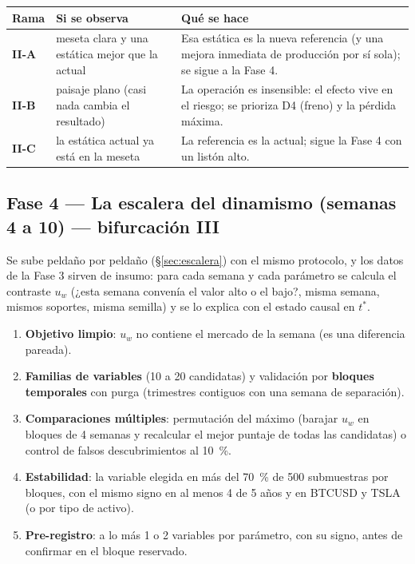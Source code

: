 \documentclass[11pt,a4paper]{article}
\begin{document}
\begin{table}[H]
\centering\small
\begin{tabularx}{\linewidth}{lXX}
\toprule
Rama & Si se observa & Qué se hace \\
\midrule
\textbf{II-A} & meseta clara y una estática mejor que la actual & Esa estática es la nueva referencia (y una mejora inmediata de producción por sí sola); se sigue a la Fase 4. \\
\textbf{II-B} & paisaje plano (casi nada cambia el resultado) & La operación es insensible: el efecto vive en el riesgo; se prioriza D4 (freno) y la pérdida máxima. \\
\textbf{II-C} & la estática actual ya está en la meseta & La referencia es la actual; sigue la Fase 4 con un listón alto. \\
\bottomrule
\end{tabularx}
\end{table}

\subsection{Fase 4 — La escalera del dinamismo (semanas 4 a 10) — bifurcación III}
Se sube peldaño por peldaño (§\ref{sec:escalera}) con el mismo protocolo, y los datos de la Fase 3 sirven de insumo:
para cada semana y cada parámetro se calcula el contraste $u_w$ (¿esta semana convenía el valor alto o el bajo?, misma
semana, mismos soportes, misma semilla) y se lo explica con el estado causal en $t^*$.

\begin{enumerate}[leftmargin=1.6em]
  \item \textbf{Objetivo limpio}: $u_w$ no contiene el mercado de la semana (es una diferencia pareada).
  \item \textbf{Familias de variables} (10 a 20 candidatas) y validación por \textbf{bloques temporales} con purga (trimestres
        contiguos con una semana de separación).
  \item \textbf{Comparaciones múltiples}: permutación del máximo (barajar $u_w$ en bloques de 4 semanas y recalcular el mejor puntaje
        de todas las candidatas) o control de falsos descubrimientos al 10~\%.
  \item \textbf{Estabilidad}: la variable elegida en más del 70~\% de 500 submuestras por bloques, con el mismo signo en al menos
        4 de 5 años y en BTCUSD y TSLA (o por tipo de activo).
  \item \textbf{Pre-registro}: a lo más 1 o 2 variables por parámetro, con su signo, antes de confirmar en el bloque reservado.
\end{enumerate}
\end{document}
